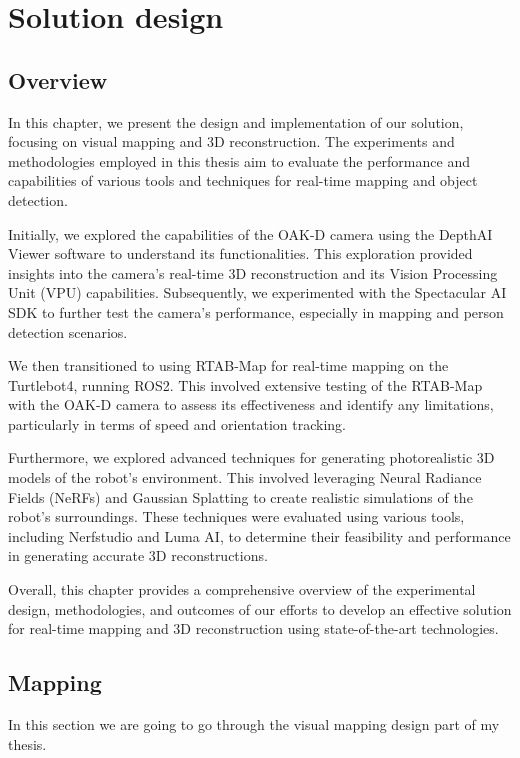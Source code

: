 \chapter{Solution design}

\section{Overview}

In this chapter, we present the design and implementation of our solution, focusing on visual mapping and 3D reconstruction. The experiments and methodologies employed in this thesis aim to evaluate the performance and capabilities of various tools and techniques for real-time mapping and object detection.

Initially, we explored the capabilities of the OAK-D camera using the DepthAI Viewer software to understand its functionalities. This exploration provided insights into the camera's real-time 3D reconstruction and its Vision Processing Unit (VPU) capabilities. Subsequently, we experimented with the Spectacular AI SDK to further test the camera's performance, especially in mapping and person detection scenarios.

We then transitioned to using RTAB-Map for real-time mapping on the Turtlebot4, running ROS2. This involved extensive testing of the RTAB-Map with the OAK-D camera to assess its effectiveness and identify any limitations, particularly in terms of speed and orientation tracking.

Furthermore, we explored advanced techniques for generating photorealistic 3D models of the robot's environment. This involved leveraging Neural Radiance Fields (NeRFs) and Gaussian Splatting to create realistic simulations of the robot's surroundings. These techniques were evaluated using various tools, including Nerfstudio and Luma AI, to determine their feasibility and performance in generating accurate 3D reconstructions.

Overall, this chapter provides a comprehensive overview of the experimental design, methodologies, and outcomes of our efforts to develop an effective solution for real-time mapping and 3D reconstruction using state-of-the-art technologies.

\section{Mapping} \label{mapping}

In this section we are going to go through the visual mapping design part of my thesis.

